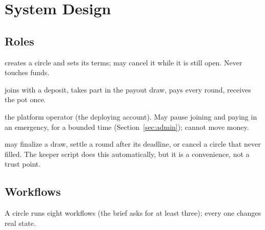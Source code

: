 \section{System Design}
\label{sec:design}

\subsection{Roles}
\begin{description}[leftmargin=2.2cm,style=nextline,itemsep=2pt]
  \item[Organizer] creates a circle and sets its terms; may cancel it while it is still open. Never
        touches funds.
  \item[Member] joins with a deposit, takes part in the payout draw, pays every round, receives the pot once.
  \item[Admin] the platform operator (the deploying account). May pause joining and paying in an
        emergency, for a bounded time (Section~\ref{sec:admin}); cannot move money.
  \item[Anyone] may finalize a draw, settle a round after its deadline, or cancel a circle that never
        filled. The keeper script does this automatically, but it is a convenience, not a trust point.
\end{description}

\subsection{Workflows}
A circle runs eight workflows (the brief asks for at least three); every one changes real state.

